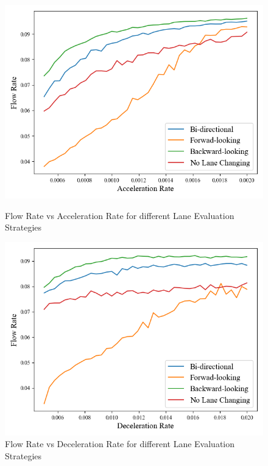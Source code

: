 \documentclass{article}
\begin{document}
\begin{figure}[H]
    \centering
    \begin{minipage}{.5\textwidth}
        \centering
        \includegraphics[width=1\textwidth]{methods-acceleration.png}
        \begin{minipage}{0.8\textwidth}
            \caption{Flow Rate vs Acceleration Rate for different Lane Evaluation Strategies}
            \label{fig:lane_strategy_acceleration}
        \end{minipage}
    \end{minipage}\hfill
    \begin{minipage}{.5\textwidth}
        \centering
        \includegraphics[width=1\textwidth]{methods-braking.png}
        \begin{minipage}{0.8\textwidth}
            \caption{Flow Rate vs Deceleration Rate for different Lane Evaluation Strategies}
            \label{fig:lane_strategy_braking}
        \end{minipage}
    \end{minipage}
\end{figure}
\end{document}
